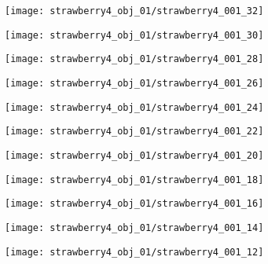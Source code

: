 \begin{figure*}
  \centering
  \begin{subfigure}[]{0.12\textwidth}
      \texttt{[image: strawberry4\_obj\_01/strawberry4\_001\_32]}
      \caption{}
  \end{subfigure}
  \begin{subfigure}[]{0.12\textwidth}
      \texttt{[image: strawberry4\_obj\_01/strawberry4\_001\_30]}
      \caption{}
  \end{subfigure}
  \begin{subfigure}[]{0.12\textwidth}
      \texttt{[image: strawberry4\_obj\_01/strawberry4\_001\_28]}
      \caption{}
  \end{subfigure}
  \begin{subfigure}[]{0.12\textwidth}
      \texttt{[image: strawberry4\_obj\_01/strawberry4\_001\_26]}
      \caption{}
  \end{subfigure}
  \begin{subfigure}[]{0.12\textwidth}
      \texttt{[image: strawberry4\_obj\_01/strawberry4\_001\_24]}
      \caption{}
  \end{subfigure}
  \begin{subfigure}[]{0.12\textwidth}
      \texttt{[image: strawberry4\_obj\_01/strawberry4\_001\_22]}
      \caption{}
  \end{subfigure}
  \begin{subfigure}[]{0.12\textwidth}
      \texttt{[image: strawberry4\_obj\_01/strawberry4\_001\_20]}
      \caption{}
  \end{subfigure}
  \begin{subfigure}[]{0.12\textwidth}
      \texttt{[image: strawberry4\_obj\_01/strawberry4\_001\_18]}
      \caption{}
  \end{subfigure}
  \begin{subfigure}[]{0.12\textwidth}
      \texttt{[image: strawberry4\_obj\_01/strawberry4\_001\_16]}
      \caption{}
  \end{subfigure}
  \begin{subfigure}[]{0.12\textwidth}
      \texttt{[image: strawberry4\_obj\_01/strawberry4\_001\_14]}
      \caption{}
  \end{subfigure}
  \begin{subfigure}[]{0.12\textwidth}
      \texttt{[image: strawberry4\_obj\_01/strawberry4\_001\_12]}
      \caption{}
  \end{subfigure}

\end{figure*}
